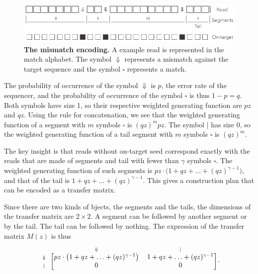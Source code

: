 \documentclass{article}
\begin{document}
\begin{figure}[h]
\centering
\includegraphics[scale=0.85]{sketch_simple.pdf}
\caption{\textbf{The mismatch encoding.}
A example read is represented in the match alphabet. The symbol
$\Downarrow$ represents a mismatch against the target sequence and
the symbol $\square$ represents a match.}
\label{fig:simple}
\end{figure}

The probability of occurrence of the symbol $\Downarrow$ is $p$, the error
rate of the sequencer, and the probability of occurrence of the symbol
$\square$ is thus $1-p = q$. Both symbols have size 1, so their respective
weighted generating function are $pz$ and $qz$. Using the rule for
concatenation, we see that the weighted generating function of a segment
with $m$ symbols $\square$ is $(qz)^mpz$. The symbol $|$ has size 0, so
the weighted generating function of a tail segment with $m$ symbols
$\square$ is $(qz)^m$.

The key insight is that reads without on-target seed correspond exactly
with the reads that are made of segments and tail with fewer than $\gamma$
symbols $\square$. The weighted generating function of such segments is
$pz \cdot \big( 1+qz+\ldots+(qz)^{\gamma-1} \big)$, and that of the tail
is $1+qz+\ldots+(qz)^{\gamma-1}$. This gives a construction plan that can
be encoded as a transfer matrix.

Since there are two kinds of bjects, the segments and the tails, the
dimensions of the transfer matrix are $2 \times 2$. A segment can be
followed by another segment or by the tail. The tail can be followed by
nothing. The expression of the transfer matrix $M(z)$ is thus
\begin{equation*}
\begin{blockarray}{ccc}
   & \scriptstyle{\Downarrow} & \scriptstyle{|} \\
\begin{block}{c[cc]}
\scriptstyle{\Downarrow} & pz \cdot \big( 1+qz+\ldots+(qz)^{\gamma-1}
\big)  & 1+qz+\ldots+(qz)^{\gamma-1} \\
\scriptstyle{|} & 0 & 0 \\
\end{block}
\end{blockarray}.
\end{equation*}
\end{document}
